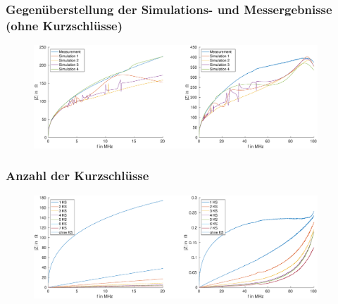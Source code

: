 \documentclass[accentcolor=tud9b, colorbacktitle, inverttitle]{tudbeamer}
\begin{document}
% 



\begin{frame}\frametitle{Gegen\"uberstellung der Simulations- und Messergebnisse (ohne Kurzschl\"usse)}
\vspace{-1em}
\begin{figure}[h]
	\centering
	\includegraphics[width=0.95\textwidth]{Zges_RK_SimMeas}
\end{figure}
\end{frame}



\begin{frame}\frametitle{Anzahl der Kurzschl\"usse}
\vspace{-1em}
\begin{figure}[h]
	\centering
	\includegraphics[width=0.95\textwidth]{impedance_numberKS_ringcore}
\end{figure}
\end{frame}
\end{document}
